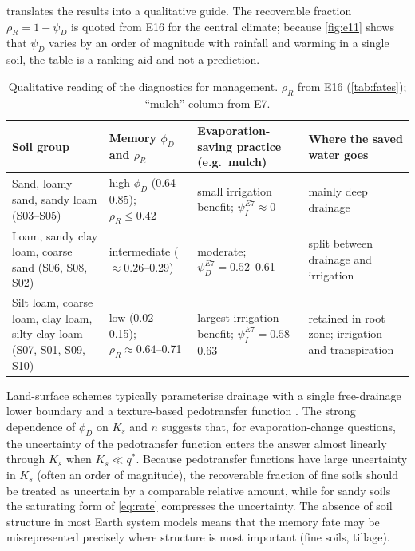 \documentclass[preprint,12pt,authoryear]{elsarticle}
\begin{document}
 translates the results into a qualitative guide. The recoverable fraction $\rho_R=1-\psi_D$ is quoted from E16 for the central climate; because \cref{fig:e11} shows that $\psi_D$ varies by an order of magnitude with rainfall and warming in a single soil, the table is a ranking aid and not a prediction.
\begin{table}[H]\centering\small
\caption{Qualitative reading of the diagnostics for management. $\rho_R$ from E16 (\cref{tab:fates}); ``mulch'' column from E7.}
\label{tab:mgmt}
\begin{tabularx}{\textwidth}{>{\raggedright\arraybackslash}p{3.3cm}>{\raggedright\arraybackslash}X>{\raggedright\arraybackslash}X>{\raggedright\arraybackslash}X}
\toprule
Soil group & Memory $\phi_D$ and $\rho_R$ & Evaporation-saving practice (e.g.\ mulch) & Where the saved water goes\\\midrule
Sand, loamy sand, sandy loam (S03--S05) & high $\phi_D$ (0.64--0.85); $\rho_R\le0.42$ & small irrigation benefit; $\psi_I^{E7}\approx0$ & mainly deep drainage\\
Loam, sandy clay loam, coarse sand (S06, S08, S02) & intermediate ($\approx0.26$--0.29) & moderate; $\psi_D^{E7}=0.52$--0.61 & split between drainage and irrigation\\
Silt loam, coarse loam, clay loam, silty clay loam (S07, S01, S09, S10) & low (0.02--0.15); $\rho_R\approx0.64$--0.71 & largest irrigation benefit; $\psi_I^{E7}=0.58$--0.63 & retained in root zone; irrigation and transpiration\\\bottomrule
\end{tabularx}
\end{table}

Land-surface schemes typically parameterise drainage with a single free-drainage lower boundary and a texture-based pedotransfer function \citep{Vereecken2019,Weber2024}. The strong dependence of $\phi_D$ on $K_s$ and $n$ suggests that, for evaporation-change questions, the uncertainty of the pedotransfer function enters the answer almost linearly through $K_s$ when $K_s\ll q^\ast$. Because pedotransfer functions have large uncertainty in $K_s$ (often an order of magnitude), the recoverable fraction of fine soils should be treated as uncertain by a comparable relative amount, while for sandy soils the saturating form of \cref{eq:rate} compresses the uncertainty. The absence of soil structure in most Earth system models \citep{Fatichi2020} means that the memory fate may be misrepresented precisely where structure is most important (fine soils, tillage).
\end{document}
